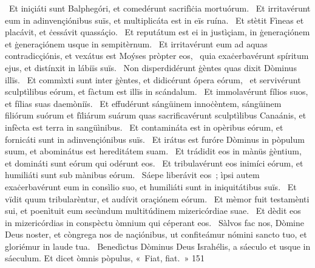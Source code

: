 {~Et iniçiáti sunt Balphegóri, et comedérunt sacrifìċia mortuórum. 
~Et irritavérunt eum in adinvençiónibus suïs, et multiplicáta est in eïs ruína. 
~Et stètit Fìneas et placávit, et ċessávit quassáçio. 
~Et reputátum est ei in justìçiam, in ġeneraçiónem et ġeneraçiónem usque in sempitèrnum. 
~Et irritavérunt eum ad aquas contradicçiónis, et vexátus est Moýses pròpter eos, 
~quia exaċerbavérunt spíritum ejus, et distínxit in lábiïs suïs. 
~Non disperdidérunt ġèntes quas dixit Dòminus illïs. 
~Et commìxti sunt inter ġèntes, et didicérunt ópera eórum, 
~et servivérunt sculptìlibus eórum, et fàctum est illïs in scándalum. 
~Et immolavérunt fílios suos, et fílias suas daemòniïs. 
~Et effudérunt sángüinem innoċèntem, sángüinem filiórum suórum et fïliárum suárum quas sacrificavérunt sculptìlibus Canaánis, et infècta est terra in sangüìnibus. 
~Et contamináta est in opèribus eórum, et fornicáti sunt in adinvençiónibus suïs. 
~Et irátus est furóre Dòminus in pòpulum suum, et abominátus est hereditátem suam. 
~Et trádidit eos in mànüs ġèntium, et domináti sunt eórum qui odérunt eos. 
~Et tribulavérunt eos inimíci eórum, et humiliáti sunt sub mànibus eórum. 
~Sáepe liberávit eos~; ìpsi autem exaċerbavérunt eum in consìlio suo, et humiliáti sunt in iniquitátibus suïs. 
~Et vïdit quum tribularèntur, et audívit oraçiónem eórum. 
~Et mèmor fuit testamènti sui, et poenìtuit eum secùndum multitúdinem mizericórdiae suae. 
~Et dèdit eos in mizericórdias in conspèctu òmnium qui céperant eos. 
~Sàlvos fac nos, Dòmine Deus noster, et còngrega nos de naçiónibus, ut confiteámur nómini sancto tuo, et gloriémur in laude tua. 
~Benedìctus Dòminus Deus Israhélis, a sáeculo et usque in sáeculum. Et dicet òmnis pòpulus, «~Fiat, fiat.~» 
}
{15}{1}
